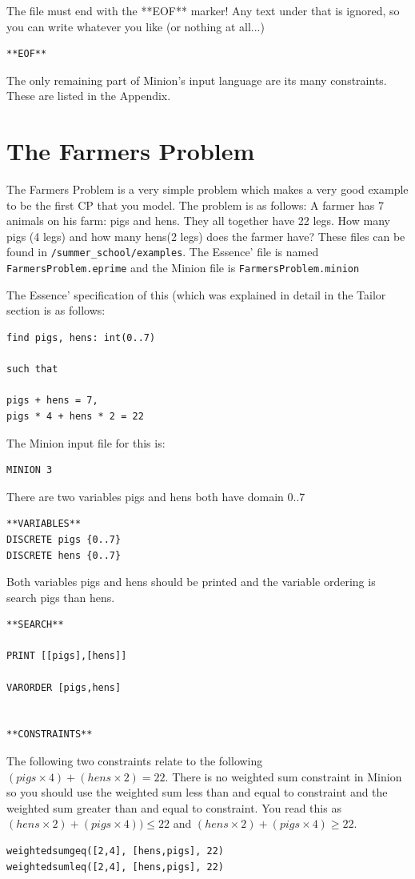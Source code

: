 \documentclass[oneside]{book}
\begin{document}
The file must end with the **EOF** marker! Any text under that is ignored, so you can write 
whatever you like (or nothing at all...)
\begin{verbatim}
**EOF**
\end{verbatim}

The only remaining part of Minion's input language are its many constraints. These are listed in the Appendix.

\section{The Farmers Problem}
The Farmers Problem is a very simple problem which makes a very good example to be the first CP that you model. The problem is as follows:  A farmer has 7 animals on his farm: pigs and hens. They all together have 22 legs. How many pigs (4 legs) and how many hens(2 legs) does the farmer have? These files can be found in \texttt{/summer\_school/examples}. The Essence' file is named \texttt{FarmersProblem.eprime} and the Minion file is \texttt{FarmersProblem.minion}

The Essence' specification of this (which was explained in detail in the Tailor section is as follows:

\begin{verbatim}
find pigs, hens: int(0..7)

such that

pigs + hens = 7,
pigs * 4 + hens * 2 = 22
\end{verbatim}

The Minion input file for this is:
\begin{verbatim}
MINION 3

\end{verbatim}
There are two variables pigs and hens  both have domain {0..7}

\begin{verbatim}
**VARIABLES**
DISCRETE pigs {0..7}
DISCRETE hens {0..7}
\end{verbatim}

Both variables pigs and hens should be printed and the variable ordering is search pigs than hens.
\begin{verbatim}
**SEARCH**

PRINT [[pigs],[hens]]

VARORDER [pigs,hens]


**CONSTRAINTS**
\end{verbatim}

The following two constraints relate to the following $(pigs \times 4) + (hens \times 2) = 22$. There is no weighted sum constraint in Minion so you should use the weighted sum less than and equal to constraint and the weighted sum greater than and equal to constraint. You read this as  $(hens \times 2) + (pigs \times 4)) \leq 22$ and $(hens \times 2) + (pigs \times 4)  \geq 22$.
\begin{verbatim}
weightedsumgeq([2,4], [hens,pigs], 22)
weightedsumleq([2,4], [hens,pigs], 22)
\end{verbatim}
\end{document}

